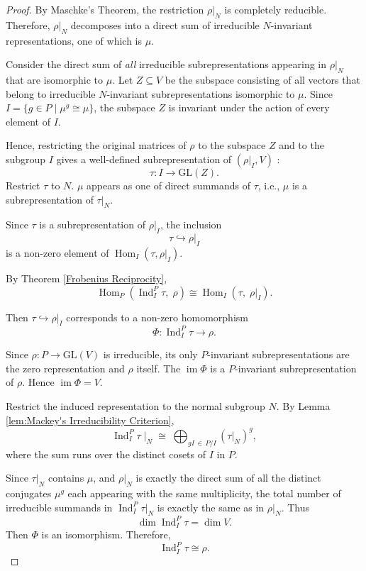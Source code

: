 \begin{proof}
By Maschke's Theorem, the restriction \(\rho|_N\) is completely reducible.
Therefore, \(\rho|_N\) decomposes into a direct sum of irreducible \(N\)-invariant  representations, one of which is \(\mu\).

Consider the direct sum of \emph{all} irreducible subrepresentations appearing in \(\rho|_N\) that are isomorphic to \(\mu\). 
Let \(Z \subseteq V\) be the subspace consisting of all vectors that belong to irreducible \(N\)-invariant  subrepresentations isomorphic to \(\mu\).
Since $I = \{ g \in P \mid \mu^g \cong \mu \}$, the subspace \(Z\) is invariant under the action of every element of \(I\). 

Hence, restricting the original matrices of \(\rho\) to the subspace \(Z\) and to the subgroup \(I\) gives a well-defined subrepresentation of \((\rho|_I,V)\) :
\[
\tau: I \to \mathrm{GL}(Z).
\]
Restrict \(\tau\) to \(N\). \(\mu\) appears as one of  direct summands of $\tau$, i.e.,  \(\mu\) is a subrepresentation of \(\tau|_N\).




Since \(\tau\) is a subrepresentation of \(\rho|_I\), the inclusion 
\[
\tau \hookrightarrow \rho|_I
\]
is a non-zero element of \(\operatorname{Hom}_{I}(\tau, \rho|_I)\). 

By Theorem \ref{Frobenius Reciprocity},
\[
\operatorname{Hom}_{P}\!\left(\operatorname{Ind}_{I}^{P} \tau,\; \rho\right)
\cong
\operatorname{Hom}_{I}\!\left(\tau,\; \rho|_I\right).
\]

Then $\tau \hookrightarrow \rho|_I$ corresponds to a non-zero homomorphism
\[
\Phi: \operatorname{Ind}_{I}^{P} \tau \to \rho.
\]


Since \(\rho: P \to \mathrm{GL}(V)\) is irreducible, its only \(P\)-invariant subrepresentations are the zero representation and \(\rho\) itself. 
The \(\operatorname{im}\Phi\) is a \(P\)-invariant subrepresentation of \(\rho\). Hence  \(\operatorname{im}\Phi=V\).


Restrict the induced representation to the normal subgroup \(N\). By Lemma \ref{lem:Mackey's Irreducibility Criterion},
\[
\operatorname{Ind}_{I}^{P} \tau \;\Big|_N \;\cong\; \bigoplus_{gI \,\in\, P/I} (\tau|_N)^g,
\]
where the sum runs over the distinct cosets of \(I\) in \(P\). 

Since \(\tau|_N\) contains \(\mu\), and \(\rho|_N\) is exactly the direct sum of all the distinct conjugates \(\mu^g\)  each appearing with the same multiplicity, the total number of irreducible summands in \(\operatorname{Ind}_{I}^{P} \tau|_N\) is exactly the same as in \(\rho|_N\). 
Thus 
\[
\dim \operatorname{Ind}_{I}^{P} \tau = \dim V.
\]
Then $\Phi$ is an isomorphism.
Therefore,
\[
\operatorname{Ind}_{I}^{P} \tau \cong \rho.
\]

\end{proof}


